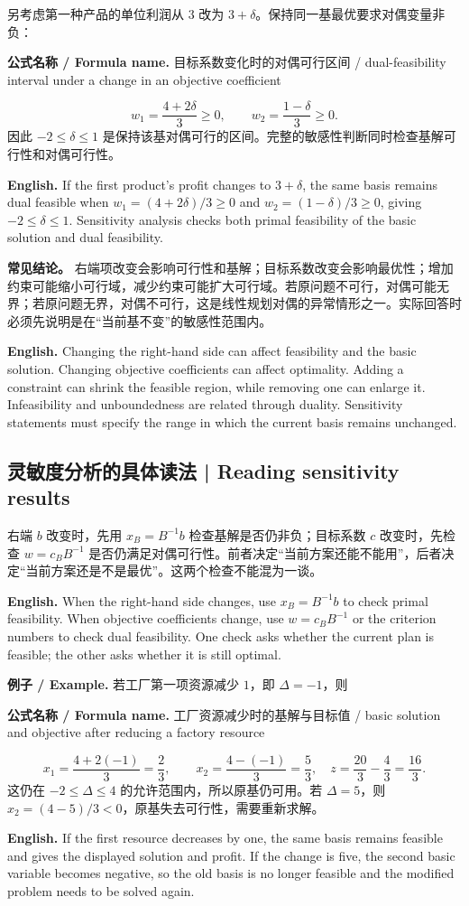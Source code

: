 \documentclass[UTF8,11pt,a4paper]{ctexart}
\newcommand{\EN}[1]{\par\noindent \textbf{English.} #1\par}
\newcommand{\FORMULA}[2]{\par\noindent\textbf{公式名称 / Formula name.} #1 / #2\par}
\newcommand{\EX}[2]{\par\noindent \textbf{例子 / Example.} #1\par\EN{#2}}
\begin{document}
另考虑第一种产品的单位利润从 $3$ 改为 $3+\delta$。保持同一基最优要求对偶变量非负：
\FORMULA{目标系数变化时的对偶可行区间}{dual-feasibility interval under a change in an objective coefficient}
\[
w_1=\frac{4+2\delta}{3}\ge0,\qquad w_2=\frac{1-\delta}{3}\ge0.
\]
因此 $-2\le\delta\le1$ 是保持该基对偶可行的区间。完整的敏感性判断同时检查基解可行性和对偶可行性。
\EN{If the first product's profit changes to $3+\delta$, the same basis remains dual feasible when $w_1=(4+2\delta)/3\ge0$ and $w_2=(1-\delta)/3\ge0$, giving $-2\le\delta\le1$. Sensitivity analysis checks both primal feasibility of the basic solution and dual feasibility.}

\noindent\textbf{常见结论。} 右端项改变会影响可行性和基解；目标系数改变会影响最优性；增加约束可能缩小可行域，减少约束可能扩大可行域。若原问题不可行，对偶可能无界；若原问题无界，对偶不可行，这是线性规划对偶的异常情形之一。实际回答时必须先说明是在“当前基不变”的敏感性范围内。
\EN{Changing the right-hand side can affect feasibility and the basic solution. Changing objective coefficients can affect optimality. Adding a constraint can shrink the feasible region, while removing one can enlarge it. Infeasibility and unboundedness are related through duality. Sensitivity statements must specify the range in which the current basis remains unchanged.}
\subsection{灵敏度分析的具体读法 | Reading sensitivity results}
\noindent 右端 $b$ 改变时，先用 $x_B=B^{-1}b$ 检查基解是否仍非负；目标系数 $c$ 改变时，先检查 $w=c_BB^{-1}$ 是否仍满足对偶可行性。前者决定“当前方案还能不能用”，后者决定“当前方案还是不是最优”。这两个检查不能混为一谈。
\EN{When the right-hand side changes, use $x_B=B^{-1}b$ to check primal feasibility. When objective coefficients change, use $w=c_BB^{-1}$ or the criterion numbers to check dual feasibility. One check asks whether the current plan is feasible; the other asks whether it is still optimal.}

\EX{若工厂第一项资源减少 $1$，即 $\Delta=-1$，则
\FORMULA{工厂资源减少时的基解与目标值}{basic solution and objective after reducing a factory resource}
\[
x_1=\frac{4+2(-1)}3=\frac23,\qquad x_2=\frac{4-(-1)}3=\frac53,
\quad z=\frac{20}3-\frac43=\frac{16}3.
\]
这仍在 $-2\le\Delta\le4$ 的允许范围内，所以原基仍可用。若 $\Delta=5$，则 $x_2=(4-5)/3<0$，原基失去可行性，需要重新求解。}{If the first resource decreases by one, the same basis remains feasible and gives the displayed solution and profit. If the change is five, the second basic variable becomes negative, so the old basis is no longer feasible and the modified problem needs to be solved again.}
\end{document}
